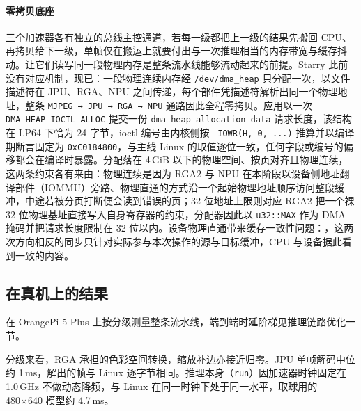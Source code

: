 \paragraph{零拷贝底座}
三个加速器各有独立的总线主控通道，若每一级都把上一级的结果先搬回 CPU、再拷贝给下一级，单帧仅在搬运上就要付出与一次推理相当的内存带宽与缓存抖动。让它们读写同一段物理内存是整条流水线能够流动起来的前提。Starry 此前没有对应机制，现已：一段物理连续内存经 \texttt{/dev/dma\_heap} 只分配一次，以文件描述符在 JPU、RGA、NPU 之间传递，每个部件凭描述符解析出同一个物理地址，整条 \texttt{MJPEG\,→\,JPU\,→\,RGA\,→\,NPU} 通路因此全程零拷贝。应用以一次 \texttt{DMA\_HEAP\_IOCTL\_ALLOC} 提交一份 \texttt{dma\_heap\_allocation\_data} 请求长度，该结构在 LP64 下恰为 24 字节，ioctl 编号由内核侧按 \texttt{\_IOWR(\textquotesingle H\textquotesingle, 0, ...)} 推算并以编译期断言固定为 \texttt{0xC0184800}，与主线 Linux 的取值逐位一致，任何字段或编号的偏移都会在编译时暴露。分配落在 4\,GiB 以下的物理空间、按页对齐且物理连续，这两条约束各有来由：物理连续是因为 RGA2 与 NPU 在本阶段以设备侧地址翻译部件（IOMMU）旁路、物理直通的方式沿一个起始物理地址顺序访问整段缓冲，中途若被分页打断便会读到错误的页；32 位地址上限则对应 RGA2 把一个裸 32 位物理基址直接写入自身寄存器的约束，分配器因此以 \texttt{u32::MAX} 作为 DMA 掩码并把请求长度限制在 32 位以内。设备物理直通带来缓存一致性问题：，这两次方向相反的同步只针对实际参与本次操作的源与目标缓冲，CPU 与设备据此看到一致的内容。

\subsection{在真机上的结果}

在 OrangePi-5-Plus 上按分级测量整条流水线，端到端时延阶梯见推理链路优化一节。

分级来看，RGA 承担的色彩空间转换，缩放补边亦接近归零。JPU 单帧解码中位约 1\,ms，解出的帧与 Linux 逐字节相同。推理本身（\texttt{run}）因加速器时钟固定在 1.0\,GHz 不做动态降频，与 Linux 在同一时钟下处于同一水平，取球用的 480×640 模型约 4.7\,ms。
